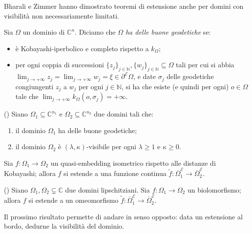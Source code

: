 Bharali e Zimmer hanno dimostrato teoremi di estensione anche per domini con visibilità non necessariamente limitati.

\begin{defn}
    Sia $\Omega$ un dominio di $\mathbb{C}^n$. Diciamo che \textit{$\Omega$ ha delle buone geodetiche} se:
    \begin{itemize}
        \item è Kobayashi-iperbolico e completo rispetto a $k_\Omega$;
        \item per ogni coppia di successioni $\{z_j\}_{j\in\mathbb{N}},\{w_j\}_{j\in\mathbb{N}}\subseteq\Omega$ tali per cui si abbia $\displaystyle\lim_{j\longrightarrow+\infty}z_j=\displaystyle\lim_{j\longrightarrow+\infty}w_j=\xi\in\partial^\mathcal{E}\Omega$, e date $\sigma_j$ delle geodetiche congiungenti $z_j$ a $w_j$ per ogni $j\in\mathbb{N}$, si ha che esiste (e quindi per ogni) $o\in\Omega$ tale che $\displaystyle\lim_{j\longrightarrow+\infty}k_\Omega(o,\sigma_j)=+\infty$.
    \end{itemize}
\end{defn}

\begin{thm}
    (\cite[Theorem 1.6]{BZ2}) Siano $\Omega_1\subseteq\mathbb{C}^{n_1}$ e $\Omega_2\subseteq\mathbb{C}^{n_2}$ due domini tali che:
    \begin{enumerate}[label={(\arabic*)}]
        \item il dominio $\Omega_1$ ha delle buone geodetiche;
        \item il dominio $\Omega_2$ è $(\lambda,\kappa)$-visibile per ogni $\lambda\ge 1$ e $\kappa\ge 0$.
    \end{enumerate}

    Sia $f:\Omega_1\longrightarrow\Omega_2$ un quasi-embedding isometrico rispetto alle distanze di Kobayashi; allora $f$ si estende a una funzione continua $\tilde{f}:\overline{\Omega}_1^\mathcal{E}\longrightarrow\overline{\Omega}_2^\mathcal{E}$.
\end{thm}

\begin{thm} \label{citchemiserveprima}
    (\cite[Theorem 1.9]{BZ2}) Siano $\Omega_1,\Omega_2\subsetneq\mathbb{C}$ due domini lipschitziani. Sia $f:\Omega_1\longrightarrow\Omega_2$ un biolomorfismo; allora $f$ si estende a un omeomorfismo $\tilde{f}:\overline{\Omega}_1^\mathcal{E}\longrightarrow\overline{\Omega}_2^\mathcal{E}$.
\end{thm}

Il prossimo risultato permette di andare in senso opposto: data un estensione al bordo, dedurne la visibilità del dominio.

